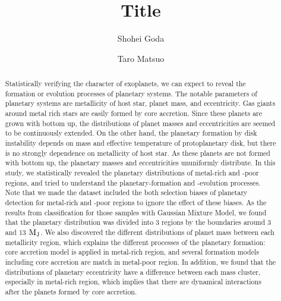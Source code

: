 \documentclass[twocolumn, dvipdfmx]{aastex62}
\begin{document}
\begin{CJK*}{UTF8}{min}

\title{Title}

\author{Shohei Goda}

\author{Taro Matsuo}


\begin{abstract}

Statistically verifying the character of exoplanets, we can expect to reveal the formation or evolution processes of planetary systems. The notable parameters of planetary systems are metallicity of host star, planet mass, and eccentricity. Gas giants around metal rich stars are easily formed by core accretion. Since these planets are grown with bottom up, the distributions of planet masses and eccentricities are seemed to be continuously extended.
On the other hand, the planetary formation by disk instability depends on mass and effective temperature of protoplanetary disk, but there is no strongly dependence on metallicity of host star. As these planets are not formed with bottom up, the planetary masses and eccentricities ununiformly distribute. In this study, we statistically revealed the planetary distributions of metal-rich and -poor regions, and tried to understand the planetary-formation and -evolution processes. Note that we made the dataset included the both selection biases of planetary detection for metal-rich and -poor regions to ignore the effect of these biases. As the results from classification for those samples with Gaussian Mixture Model, we found that the planetary distribution was divided into 3 regions by the boundaries around 3 and 13 $\rm M_J$. We also discovered the different distributions of planet mass between each metallicity region, which explains the different processes of the planetary formation: core accretion model is applied in metal-rich region, and several formation models including core accretion are match in metal-poor region. In addition, we found that the distributions of planetary eccentricity have a difference between each mass cluster, especially in metal-rich region, which implies that there are dynamical interactions after the planets formed by core accretion.


\end{abstract}


\end{CJK*}
\end{document}
